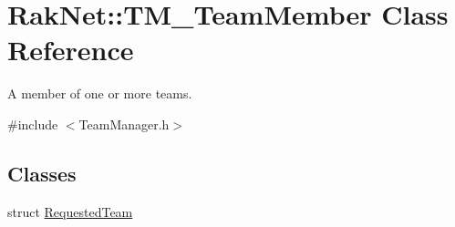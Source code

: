 \hypertarget{class_rak_net_1_1_t_m___team_member}{\section{Rak\-Net\-:\-:T\-M\-\_\-\-Team\-Member Class Reference}
\label{class_rak_net_1_1_t_m___team_member}
}


A member of one or more teams.  




{\ttfamily \#include $<$Team\-Manager.\-h$>$}

\subsection*{Classes}
\begin{DoxyCompactItemize}
\item 
struct \hyperlink{struct_rak_net_1_1_t_m___team_member_1_1_requested_team}{Requested\-Team}
\end{DoxyCompactItemize}
